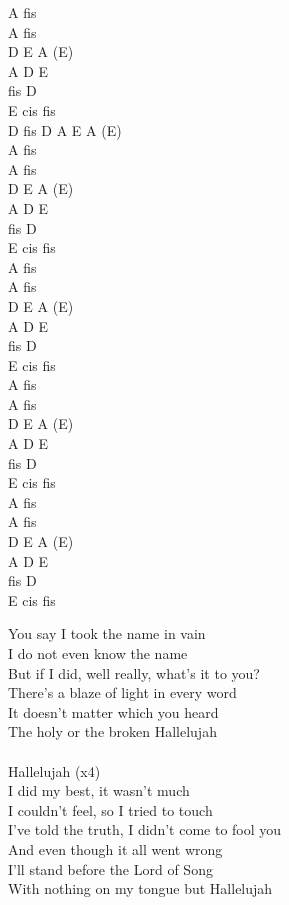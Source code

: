 \documentclass[a5paper, 10pt]{book}
\begin{document}
\begin{minipage}[t]{0.2\textwidth}
 A fis\\
 A fis\\
 D E A (E)\\
 A D E\\
 fis D\\
 E cis fis\\
 
 D fis D A E A (E)\\

  A fis\\
 A fis\\
 D E A (E)\\
 A D E\\
 fis D\\
 E cis fis\\

  A fis\\
 A fis\\
 D E A (E)\\
 A D E\\
 fis D\\
 E cis fis\\

  A fis\\
 A fis\\
 D E A (E)\\
 A D E\\
 fis D\\
 E cis fis\\

  A fis\\
 A fis\\
 D E A (E)\\
 A D E\\
 fis D\\
 E cis fis\\

\end{minipage}
\begin{minipage}[t]{0.8\textwidth}
You say I took the name in vain\\
I do not even know the name\\
But if I did, well really, what's it to you?\\
There's a blaze of light in every word\\
It doesn't matter which you heard\\
The holy or the broken Hallelujah\\
\\
\hspace*{6mm}Hallelujah (x4)\\

I did my best, it wasn't much\\
I couldn't feel, so I tried to touch\\
I've told the truth, I didn't come to fool you\\
And even though it all went wrong\\
I'll stand before the Lord of Song\\
With nothing on my tongue but Hallelujah\\
\end{minipage}
\end{document}
